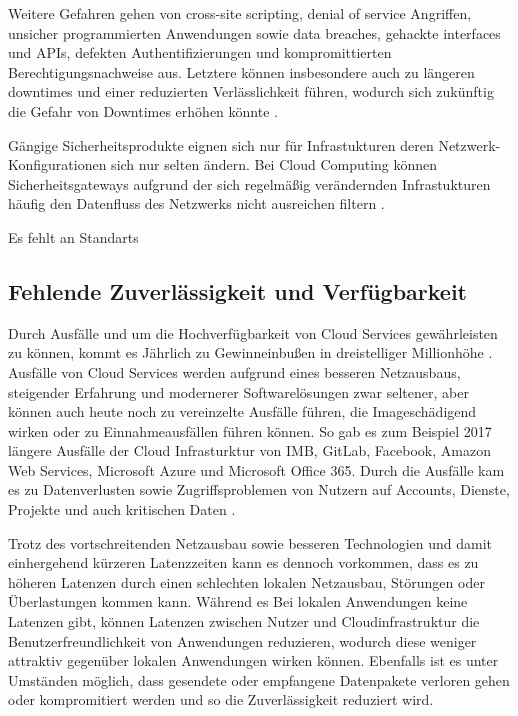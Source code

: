 Weitere Gefahren gehen von cross-site scripting, denial of service Angriffen, 
unsicher programmierten Anwendungen sowie 
data breaches, gehackte interfaces und APIs, defekten Authentifizierungen 
und kompromittierten Berechtigungsnachweise aus. 
Letztere können insbesondere auch zu längeren downtimes und einer reduzierten Verlässlichkeit führen, 
wodurch sich zukünftig die Gefahr von Downtimes erhöhen könnte \cite{jabbar2020}.

Gängige Sicherheitsprodukte eignen sich nur für Infrastukturen deren Netzwerk-Konfigurationen sich nur selten ändern. Bei Cloud Computing können Sicherheitsgateways aufgrund der sich regelmäßig verändernden Infrastukturen häufig  den Datenfluss des Netzwerks nicht ausreichen filtern \cite{wehrhahn-aklender2019}.

Es fehlt an Standarts \cite{puthal2015}

\subsection{Fehlende Zuverlässigkeit und Verfügbarkeit}
\label{sec:fehlende-Sicherheit}
Durch Ausfälle und um die Hochverfügbarkeit von Cloud Services gewährleisten zu können, 
kommt es Jährlich zu Gewinneinbußen in dreistelliger Millionhöhe \cite{snyder2015}.
Ausfälle von Cloud Services werden aufgrund eines besseren Netzausbaus, 
steigender Erfahrung und modernerer Softwarelösungen zwar seltener, 
aber können auch heute noch zu vereinzelte Ausfälle führen, die Imageschädigend wirken oder zu Einnahmeausfällen führen können. 
So gab es zum Beispiel 2017 längere Ausfälle der Cloud Infrasturktur von 
IMB, GitLab, Facebook, Amazon Web Services, Microsoft Azure und Microsoft Office 365. 
Durch die Ausfälle kam es zu Datenverlusten sowie Zugriffsproblemen von Nutzern auf Accounts, 
Dienste, Projekte und auch kritischen Daten \cite{tsidulko2017}.

Trotz des vortschreitenden Netzausbau sowie besseren Technologien und damit einhergehend kürzeren Latenzzeiten kann es dennoch vorkommen, dass es zu höheren Latenzen durch einen schlechten lokalen Netzausbau, Störungen oder Überlastungen kommen kann.
Während es Bei lokalen Anwendungen keine Latenzen gibt, können Latenzen zwischen Nutzer und Cloudinfrastruktur die Benutzerfreundlichkeit von Anwendungen reduzieren, wodurch diese weniger attraktiv gegenüber lokalen Anwendungen wirken können.
Ebenfalls ist es unter Umständen möglich, dass gesendete oder empfangene Datenpakete verloren gehen oder kompromitiert werden und so die Zuverlässigkeit reduziert wird. 

